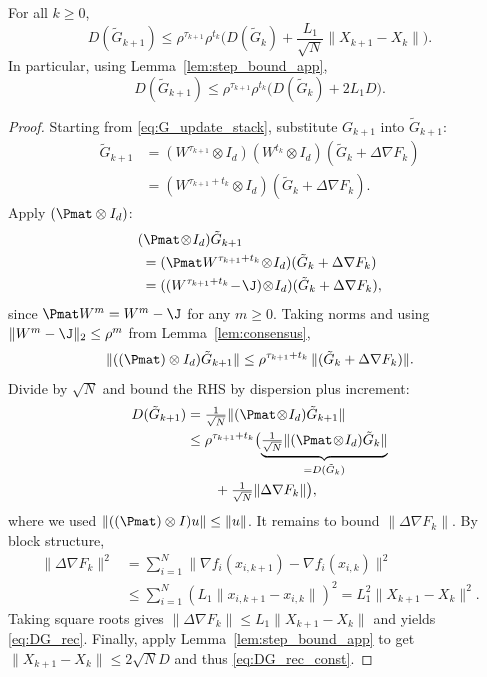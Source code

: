 \documentclass[review,onefignum,onetabnum]{siamart171218}
\begin{document}
\begin{lemma}\label{lem:DG_rec}
For all $k\ge0$,
\begin{equation}\label{eq:DG_rec}
D(\tilde G_{k+1})
\le \rho^{\tau_{k+1}}\rho^{t_k}\Big(D(\tilde G_k)+\frac{L_1}{\sqrt N}\|X_{k+1}-X_k\|\Big).
\end{equation}
In particular, using Lemma~\ref{lem:step_bound_app},
\begin{equation}\label{eq:DG_rec_const}
D(\tilde G_{k+1})
\le \rho^{\tau_{k+1}}\rho^{t_k}\Big(D(\tilde G_k)+2L_1D\Big).
\end{equation}
\end{lemma}
\begin{proof}
Starting from \eqref{eq:G_update_stack}, substitute $G_{k+1}$ into $\tilde G_{k+1}$:
\begin{align*}
\tilde G_{k+1}
&=(W^{\tau_{k+1}}\!\otimes\! I_d)(W^{t_k}\!\otimes\! I_d)(\tilde G_k\!+\!\Delta\nabla F_k)\\
&=(W^{\tau_{k+1}+t_k}\!\otimes\! I_d)(\tilde G_k\!+\!\Delta\nabla F_k).
\end{align*}
Apply $(\Pmat\otimes I_d)$:
\begin{align*}
&(\Pmat\!\otimes\! I_d)\tilde G_{k+1}\\
&\;=(\Pmat W^{\tau_{k+1}+t_k}\!\otimes\! I_d)(\tilde G_k+\Delta\nabla F_k)\\
&\;=((W^{\tau_{k+1}+t_k}\!-\!\J)\!\otimes\! I_d)(\tilde G_k+\Delta\nabla F_k),
\end{align*}
since $\Pmat W^m=W^m-\J$ for any $m\ge0$.
Taking norms and using $\|W^{m}-\J\|_2\le \rho^{m}$ from Lemma~\ref{lem:consensus},
\[
\|((\Pmat)\otimes I_d)\tilde G_{k+1}\|
\le \rho^{\tau_{k+1}+t_k}\,\|(\tilde G_k+\Delta\nabla F_k)\|.
\]
Divide by $\sqrt N$ and bound the RHS by dispersion plus increment:
\begin{align*}
D(\tilde G_{k+1})
&=\tfrac1{\sqrt N}\|(\Pmat\!\otimes\! I_d)\tilde G_{k+1}\|\\
&\le \rho^{\tau_{k+1}+t_k}\bigl(
\underbrace{\tfrac1{\sqrt N}\|(\Pmat\!\otimes\! I_d)\tilde G_k\|}_{=D(\tilde G_k)}\\
&\qquad+\tfrac1{\sqrt N}\|\Delta\nabla F_k\|\bigr),
\end{align*}
where we used $\|((\Pmat)\otimes I)u\|\le \|u\|$.
It remains to bound $\|\Delta\nabla F_k\|$.
By block structure,
\begin{align*}
\|\Delta\nabla F_k\|^2
&=\textstyle\sum_{i=1}^N\|\nabla f_i(x_{i,k+1})\!-\!\nabla f_i(x_{i,k})\|^2\\
&\le \textstyle\sum_{i=1}^N (L_1\|x_{i,k+1}\!-\!x_{i,k}\|)^2
=L_1^2\|X_{k+1}\!-\!X_k\|^2.
\end{align*}
Taking square roots gives $\|\Delta\nabla F_k\|\le L_1\|X_{k+1}-X_k\|$ and yields \eqref{eq:DG_rec}.
Finally, apply Lemma~\ref{lem:step_bound_app} to get $\|X_{k+1}-X_k\|\le 2\sqrt N D$ and thus \eqref{eq:DG_rec_const}.
\end{proof}
\end{document}
